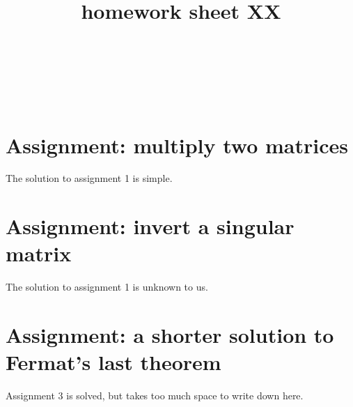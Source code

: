 \documentclass{article}
\title{homework sheet XX}
\author{
\name{Jade Shade}\\
\imat{1627482920}\\
\email{jade@shade.com}
\And
\name{Pete Sheet} \\
\imat{4872903849}\\
\email{pete@sheet.com}
}
\begin{document}
\maketitle

\section{Assignment: multiply two matrices}
The solution to assignment 1 is simple.

\section{Assignment: invert a singular matrix}
The solution to assignment 1 is unknown to us.

\section{Assignment: a shorter solution to Fermat's last theorem }
Assignment 3 is solved, but takes too much space to write down here.
\end{document}
